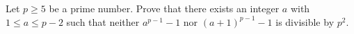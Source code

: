 Let $p \geq 5$ be a prime number. Prove that there exists an integer $a$ with $1 \leq a \leq p-2$ such that neither $a^{p-1}-1$ nor $(a+1)^{p-1}-1$ is divisible by $p^2$.
